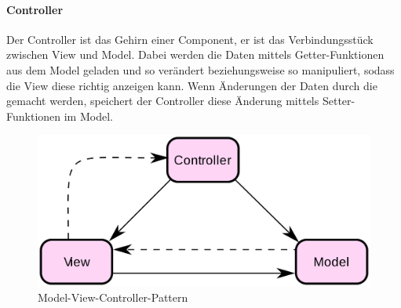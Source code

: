 \paragraph{Controller}
Der Controller ist das Gehirn einer Component, er ist das Verbindungsstück zwischen View und Model.
Dabei werden die Daten mittels Getter-Funktionen aus dem Model geladen und so verändert beziehungsweise so manipuliert, sodass die View diese richtig
anzeigen kann.
Wenn Änderungen der Daten durch die gemacht werden, speichert der Controller diese Änderung mittels Setter-Funktionen im Model.

\begin{figure}[hbt!]
    \centering
    \includegraphics[scale=0.1]{pics/mvc_design_pattern}
    \caption{Model-View-Controller-Pattern}
    \label{fig:mvc_design_pattern}
\end{figure}
